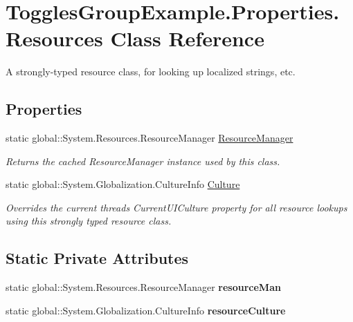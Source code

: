 \hypertarget{class_toggles_group_example_1_1_properties_1_1_resources}{}\section{Toggles\+Group\+Example.\+Properties.\+Resources Class Reference}
\label{class_toggles_group_example_1_1_properties_1_1_resources}


A strongly-\/typed resource class, for looking up localized strings, etc.  


\subsection*{Properties}
\begin{DoxyCompactItemize}
\item 
static global\+::\+System.\+Resources.\+Resource\+Manager \mbox{\hyperlink{class_toggles_group_example_1_1_properties_1_1_resources_a4c7680175111d8ad445e79bea478a3d9}{Resource\+Manager}}
\begin{DoxyCompactList}\small\item\em Returns the cached Resource\+Manager instance used by this class. \end{DoxyCompactList}\item 
static global\+::\+System.\+Globalization.\+Culture\+Info \mbox{\hyperlink{class_toggles_group_example_1_1_properties_1_1_resources_a360fcc8a99c6f2847f60e7d5e0e9c512}{Culture}}
\begin{DoxyCompactList}\small\item\em Overrides the current thread\textquotesingle{}s Current\+U\+I\+Culture property for all resource lookups using this strongly typed resource class. \end{DoxyCompactList}\end{DoxyCompactItemize}
\subsection*{Static Private Attributes}
\begin{DoxyCompactItemize}
\item 
\mbox{\label{class_toggles_group_example_1_1_properties_1_1_resources_a77682137b11d403f79bd002f819b55f1}} 
static global\+::\+System.\+Resources.\+Resource\+Manager {\bfseries resource\+Man}
\item 
\mbox{\label{class_toggles_group_example_1_1_properties_1_1_resources_ad704bcd852261b5e61bf8d97c23c8afa}} 
static global\+::\+System.\+Globalization.\+Culture\+Info {\bfseries resource\+Culture}
\end{DoxyCompactItemize}


